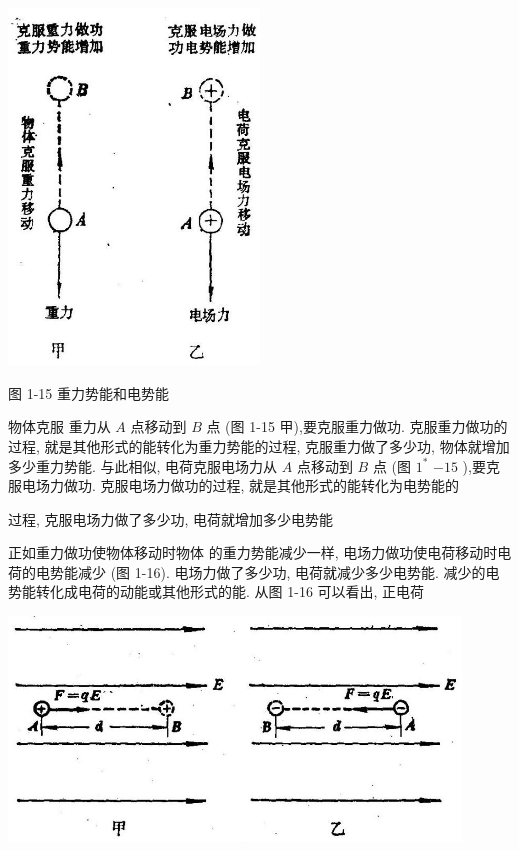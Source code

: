 \documentclass[10pt]{article}
\begin{document}
\begin{center}
\includegraphics[max width=0.5\textwidth]{images/01913056-1f15-74d8-9184-9aab52c9d66b_28_549025.jpg}
\end{center}

图 1-15 重力势能和电势能

物体克服 重力从 \(A\) 点移动到 \(B\) 点 (图 1-15 甲),要克服重力做功. 克服重力做功的过程, 就是其他形式的能转化为重力势能的过程, 克服重力做了多少功, 物体就增加多少重力势能. 与此相似, 电荷克服电场力从 \(A\) 点移动到 \(B\) 点 (图 \({1}^{ * }\) \(- {15}\) ),要克服电场力做功. 克服电场力做功的过程, 就是其他形式的能转化为电势能的

过程, 克服电场力做了多少功, 电荷就增加多少电势能

正如重力做功使物体移动时物体 的重力势能减少一样, 电场力做功使电荷移动时电荷的电势能减少 (图 1-16). 电场力做了多少功, 电荷就减少多少电势能. 减少的电势能转化成电荷的动能或其他形式的能. 从图 1-16 可以看出, 正电荷

\begin{center}
\includegraphics[max width=0.9\textwidth]{images/01913056-1f15-74d8-9184-9aab52c9d66b_29_484073.jpg}
\end{center}
\end{document}
